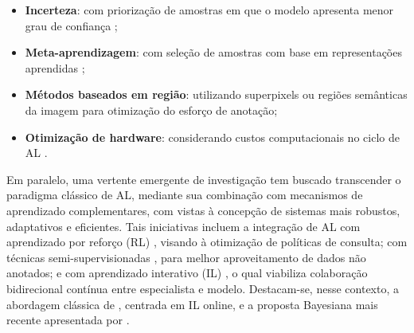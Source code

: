 \begin{itemize}

\item \textbf{Incerteza}: com priorização de amostras em que o modelo apresenta menor grau de confiança \cite{xie2022ripu, zheng2024alintro};

\item \textbf{Meta-aprendizagem}: com seleção de amostras com base em representações aprendidas \cite{konyushkova2017learning};

\item \textbf{Métodos baseados em região}: utilizando superpixels \cite{kim2023adaptive, mackowiak2018cereals} ou regiões semânticas da imagem \cite{rangnekar2022region} para otimização do esforço de anotação;

\item \textbf{Otimização de hardware}: considerando custos computacionais no ciclo de \ac{AL} \cite{franco2023halo}.
\end{itemize}

Em paralelo, uma vertente emergente de investigação \cite{casanova2020reinforced, rangnekar2022mean, karamcheti2021dial, triebel2014active} tem buscado transcender o paradigma clássico de \ac{AL}, mediante sua combinação com mecanismos de aprendizado complementares, com vistas à concepção de sistemas mais robustos, adaptativos e eficientes. Tais iniciativas incluem a integração de \ac{AL} com aprendizado por reforço (\ac{RL}) \cite{casanova2020reinforced}, visando à otimização de políticas de consulta; com técnicas semi-supervisionadas \cite{rangnekar2022mean}, para melhor aproveitamento de dados não anotados; e com aprendizado interativo (\ac{IL}) \cite{karamcheti2021dial, triebel2014active}, o qual viabiliza colaboração bidirecional contínua entre especialista e modelo. Destacam-se, nesse contexto, a abordagem clássica de , centrada em \ac{IL} online, e a proposta Bayesiana mais recente apresentada por \cite{karamcheti2021dial}.


